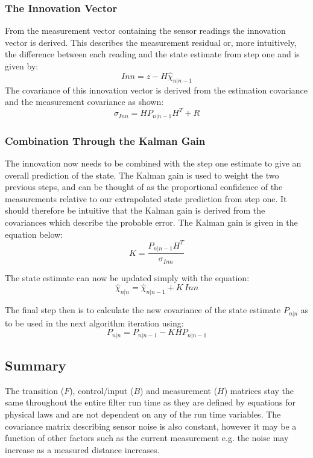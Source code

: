 \subsubsection{The Innovation Vector}
	From the measurement vector containing the sensor readings the innovation vector is derived. This describes the measurement residual or, more intuitively, the difference between each reading and the state estimate from step one and is given by:
  \[Inn 
  =
  z - H\hat{\chi}_{n|n-1}\]
  The covariance of this innovation vector is derived from the estimation covariance and the measurement covariance as shown:
\[\sigma_{Inn}
=
H P_{n|n-1} H^T + R\]

\subsubsection{Combination Through the Kalman Gain}
The innovation now needs to be combined with the step one estimate to give an overall prediction of the state. The Kalman gain is used to weight the two previous steps, and can be thought of as the proportional confidence of the measurements relative to our extrapolated state prediction from step one. It should therefore be intuitive that the Kalman gain is derived from the covariances which describe the probable error. The Kalman gain is given in the equation below:
\[K
=
\frac{P_{n|n-1} H^T}{\sigma_{Inn}}\]

The state estimate can now be updated simply with the equation:
\[\hat{\chi}_{n|n}
=
\hat{\chi}_{n|n-1} + K\, Inn\]

The final step then is to calculate the new covariance of the state estimate \(P_{n|n}\) as to be used in the next algorithm iteration using:
\[P_{n|n}
=
P_{n|n-1} - K H P_{n|n-1}\]

\subsection{Summary}
The transition (\(F\)), control/input (\(B\)) and measurement (\(H\)) matrices stay the same throughout the entire filter run time as they are defined by equations for physical laws and are not dependent on any of the run time variables. The covariance matrix describing sensor noise is also constant, however it may be a function of other factors such as the current measurement e.g. the noise may increase as a measured distance increases.













